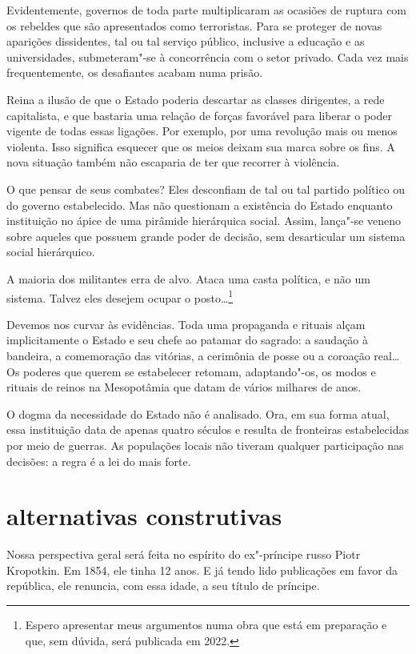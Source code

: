 Evidentemente, governos de toda parte multiplicaram as ocasiões de
ruptura com os rebeldes que são apresentados como terroristas. Para se
proteger de novas aparições dissidentes, tal ou tal serviço público,
inclusive a educação e as universidades, submeteram"-se à concorrência
com o setor privado. Cada vez mais frequentemente, os desafiantes acabam
numa prisão.

Reina a ilusão de que o Estado poderia descartar as classes dirigentes,
a rede capitalista, e que bastaria uma relação de forças favorável para
liberar o poder vigente de todas essas ligações. Por exemplo, por uma
revolução mais ou menos violenta. Isso significa esquecer que os meios
deixam sua marca sobre os fins. A nova situação também não escaparia de
ter que recorrer à violência.

O que pensar de seus combates? Eles desconfiam de tal ou tal partido
político ou do governo estabelecido. Mas não questionam a existência do
Estado enquanto instituição no ápice de uma pirâmide hierárquica social.
Assim, lança"-se veneno sobre aqueles que possuem grande poder de
decisão, sem desarticular um sistema social hierárquico.

A maioria dos militantes erra de alvo. Ataca uma casta política, e não
um sistema. Talvez eles desejem ocupar o posto\ldots{}\footnote{Espero
  apresentar meus argumentos numa obra que está em preparação e que, sem
  dúvida, será publicada em 2022.}

Devemos nos curvar às evidências. Toda uma propaganda e rituais alçam
implicitamente o Estado e seu chefe ao patamar do sagrado: a saudação à
bandeira, a comemoração das vitórias, a cerimônia de posse ou a coroação
real\ldots{} Os poderes que querem se estabelecer retomam, adaptando"-os, os
modos e rituais de reinos na Mesopotâmia que datam de vários milhares de
anos.

O dogma da necessidade do Estado não é analisado. Ora, em sua forma
atual, essa instituição data de apenas quatro séculos e resulta de
fronteiras estabelecidas por meio de guerras. As populações locais não
tiveram qualquer participação nas decisões: a regra é a lei do mais
forte.

\section{alternativas construtivas}

Nossa perspectiva geral será feita no espírito do ex"-príncipe russo
Piotr Kropotkin. Em 1854, ele tinha 12 anos. E já tendo lido publicações
em favor da república, ele renuncia, com essa idade, a seu título de
príncipe.

